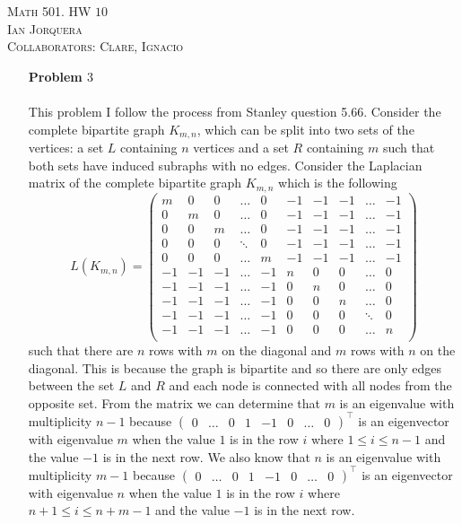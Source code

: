 \documentclass[12pt]{amsart}
\theoremstyle{definition}
\begin{document}
\begin{center}
    \textsc{Math 501. HW $10$\\ Ian Jorquera\\ Collaborators: Clare, Ignacio}
\end{center}
\vspace{1em}

\begin{itemize}[align=left]

\item[\textbf{Problem $3$}]\;\\\\ %
This problem I follow the process from Stanley question 5.66. Consider the complete bipartite graph $K_{m,n}$, which can be split into two sets of the vertices: a set $L$ containing $n$ vertices and a set $R$ containing $m$ such that both sets have induced subraphs with no edges. Consider the Laplacian matrix of the complete bipartite graph $K_{m,n}$ which is the following 
$$L(K_{m,n})=\begin{pmatrix}
    m& 0 & 0 & \dots & 0 & -1 & -1 & -1 & \dots & -1\\
    0& m & 0 & \dots & 0 & -1 & -1 & -1 & \dots & -1\\
    0& 0 & m & \dots & 0 & -1 & -1 & -1 & \dots & -1\\
    0& 0 & 0 &\ddots & 0 & -1 & -1 & -1 & \dots & -1\\
    0& 0 & 0 & \dots & m & -1 & -1 & -1 & \dots & -1\\
    -1 & -1& -1  & \dots & -1 & n& 0 & 0 & \dots & 0\\
    -1 & -1& -1  & \dots & -1 & 0& n & 0 & \dots & 0\\
    -1 & -1& -1  & \dots & -1 & 0& 0 & n & \dots & 0\\
    -1 & -1& -1  & \dots & -1 & 0& 0 & 0 &\ddots & 0\\
    -1 & -1& -1  & \dots & -1 & 0& 0 & 0 & \dots & n\\
\end{pmatrix}$$
such that there are $n$ rows with $m$ on the diagonal and $m$ rows with $n$ on the diagonal. This is because the graph is bipartite and so there are only edges between the set $L$ and $R$ and each node is connected with all nodes from the opposite set. From the matrix we can determine that $m$ is an eigenvalue with multiplicity $n-1$ because $\begin{pmatrix} 0&\dots &0& 1&-1&0&\dots&0 \end{pmatrix}^\intercal$ is an eigenvector with eigenvalue $m$ when the value $1$ is in the row $i$ where $1\leq i\leq n-1$ and the value $-1$ is in the next row. We also know that $n$ is an eigenvalue with multiplicity $m-1$ because $\begin{pmatrix} 0&\dots &0& 1&-1&0&\dots&0 \end{pmatrix}^\intercal$ is an eigenvector with eigenvalue $n$ when the value $1$ is in the row $i$ where $n+1\leq i\leq n+m-1$ and the value $-1$ is in the next row. 

\end{itemize}
\end{document}
